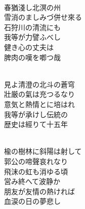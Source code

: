 \documentclass[10pt,b5j]{tarticle} %
\begin{document}
\vspace{1.5em} %
\newcommand{\linespace}{0.5em} %
\newcommand{\blocksize}{0.5\hsize} %
\newcommand{\itemmargin}{3em} %
\begin{enumerate} %
    \setlength{\itemindent}{\itemmargin} %
    \begin{minipage}[c]{\blocksize}
    
        \vspace{\linespace}
        \item~\\
        春猶淺し北溟の州\\
        雪消のましみづ併せ來る\\
        石狩川の清流にも\\
        我等が力譬ふべし\\
        健き心の丈夫は\\
        脾肉の嘆を喞つ哉
        
    \end{minipage}
    \begin{minipage}[c]{\blocksize}
        
        \vspace{\linespace}
        \item~\\
        見よ清澄の北斗の蒼穹\\
        壯厳の氣は充つるなり\\
        意気と熱情とに培はれ\\
        我等が承けし伝統の\\
        歴史は經りて十五年
        
    \end{minipage}
    \begin{minipage}[c]{\blocksize}
        
        \vspace{\linespace}
        \item~\\
        楡の樹林に斜陽は射して\\
        郭公の啼聲哀れなり\\
        飛沫の虹も消ゆる頃\\
        営み終へて波静か\\
        朋友が友情の熱ければ\\
        血涙の日の夢悲し
        

\end{minipage}
\end{enumerate}
\end{document}
